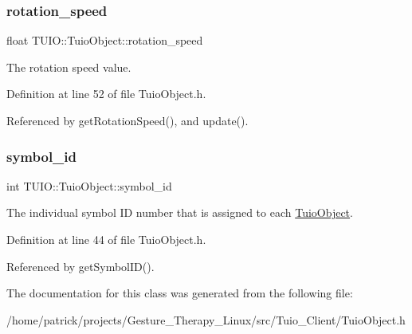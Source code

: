 \subsubsection{\texorpdfstring{rotation\+\_\+speed}{rotation\_speed}}
{\footnotesize\ttfamily float T\+U\+I\+O\+::\+Tuio\+Object\+::rotation\+\_\+speed\hspace{0.3cm}{\ttfamily [protected]}}

The rotation speed value. 

Definition at line 52 of file Tuio\+Object.\+h.



Referenced by get\+Rotation\+Speed(), and update().

\mbox{\label{class_t_u_i_o_1_1_tuio_object_a05c245f10efaa7bf97b6c383004d6b7f}} 
\subsubsection{\texorpdfstring{symbol\+\_\+id}{symbol\_id}}
{\footnotesize\ttfamily int T\+U\+I\+O\+::\+Tuio\+Object\+::symbol\+\_\+id\hspace{0.3cm}{\ttfamily [protected]}}

The individual symbol ID number that is assigned to each \hyperlink{class_t_u_i_o_1_1_tuio_object}{Tuio\+Object}. 

Definition at line 44 of file Tuio\+Object.\+h.



Referenced by get\+Symbol\+I\+D().



The documentation for this class was generated from the following file\+:\begin{DoxyCompactItemize}
\item 
/home/patrick/projects/\+Gesture\+\_\+\+Therapy\+\_\+\+Linux/src/\+Tuio\+\_\+\+Client/Tuio\+Object.\+h\end{DoxyCompactItemize}
